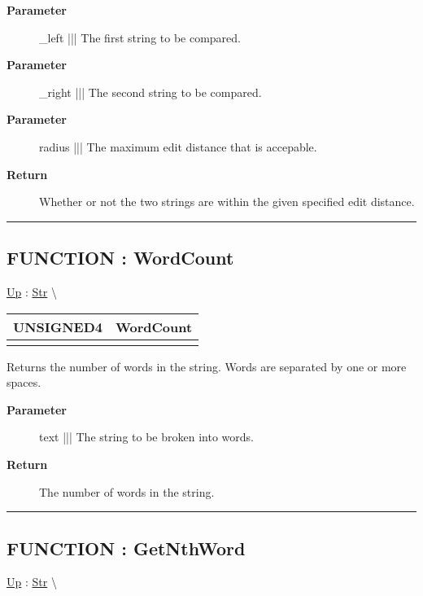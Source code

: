 \par
\begin{description}
\item [\textbf{Parameter}] \_left ||| The first string to be compared.
\item [\textbf{Parameter}] \_right ||| The second string to be compared.
\item [\textbf{Parameter}] radius ||| The maximum edit distance that is accepable.
\item [\textbf{Return}] Whether or not the two strings are within the given specified edit distance.
\end{description}

\rule{\linewidth}{0.5pt}
\subsection*{FUNCTION : WordCount}
\hypertarget{ecldoc:str.wordcount}{}
\hyperlink{ecldoc:Str}{Up} :
\hspace{0pt} \hyperlink{ecldoc:Str}{Str} \textbackslash 

{\renewcommand{\arraystretch}{1.5}
\begin{tabularx}{\textwidth}{|>{\raggedright\arraybackslash}l|X|}
\hline
\hspace{0pt}UNSIGNED4 & WordCount \\
\hline
\multicolumn{2}{|>{\raggedright\arraybackslash}X|}{\hspace{0pt}(STRING text)} \\
\hline
\end{tabularx}
}

\par
Returns the number of words in the string. Words are separated by one or more spaces.

\par
\begin{description}
\item [\textbf{Parameter}] text ||| The string to be broken into words.
\item [\textbf{Return}] The number of words in the string.
\end{description}

\rule{\linewidth}{0.5pt}
\subsection*{FUNCTION : GetNthWord}
\hypertarget{ecldoc:str.getnthword}{}
\hyperlink{ecldoc:Str}{Up} :
\hspace{0pt} \hyperlink{ecldoc:Str}{Str} \textbackslash 

